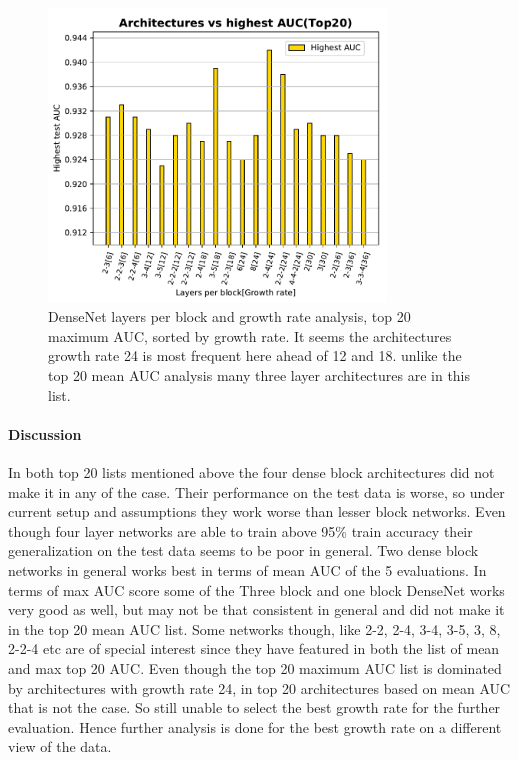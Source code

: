\begin{figure}[ht]
\centering
\includegraphics[width=0.8\textwidth]{images/densenet/siamese/densenet_siamese_max_bar}
\caption[DenseNet layers per block and growth rate max AUC analysis]{DenseNet layers per block and growth rate analysis, top 20 maximum AUC, sorted by growth rate. It seems the architectures growth rate 24 is most frequent here ahead of 12 and 18. unlike the top 20 mean AUC analysis many three layer
architectures are in this list.}
\label{fig:maxAUC_five}
\end{figure}

\paragraph{Discussion\\}
 In both top 20 lists mentioned above the four dense block architectures did not make it in any of the case. Their performance on the test data is worse, so under current setup and assumptions they work worse than lesser block networks.
 Even though four layer networks are able to train above 95\% train accuracy their generalization on the test data seems to be poor in general.
 Two dense block networks in general works best in terms of mean AUC of the 5 evaluations.
 In terms of max AUC score some of the Three block and one block DenseNet works very good as well, but may not be that consistent in general and did not make it in the top 20 mean AUC list.
 Some networks though, like 2-2, 2-4, 3-4, 3-5, 3, 8, 2-2-4 etc are of special interest since they have featured in both the list of mean and max top 20 AUC. Even though the top 20 maximum AUC list is dominated by architectures with growth rate 
 24, in top 20 architectures based on mean AUC that is not the case. So still unable to select the best growth rate for the further evaluation. Hence further analysis is done for the best growth rate on a different view of the data.

